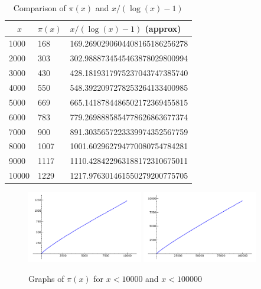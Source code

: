 \begin{table}
\caption{Comparison of $\pi(x)$ and $x/(\log(x)-1)$\label{tab:pnt}}\vspace{1ex}

\begin{center}
\begin{tabular}{|l|l|l|}\hline
$\quad{}\!x$& $\pi(x)$ & $x/(\log(x)-1)$ (approx)\\\hline
1000&   168&    169.2690290604408165186256278\\
2000&   303&    302.9888734545463878029800994\\
3000&   430&    428.1819317975237043747385740\\
4000&   550&    548.3922097278253264133400985\\
5000&   669&    665.1418784486502172369455815\\
6000&   783&    779.2698885854778626863677374\\
7000&   900&    891.3035657223339974352567759\\
8000&   1007&   1001.602962794770080754784281\\
9000&   1117&   1110.428422963188172310675011\\
10000&  1229&   1217.976301461550279200775705\\\hline
\end{tabular}
\end{center}
\end{table}

\begin{figure}
\begin{center}
\vspace{2ex}
\includegraphics[width=0.45\textwidth]{graphics/prime_pi_10000}
\vspace{4ex}
\includegraphics[width=0.45\textwidth]{graphics/prime_pi_100000}
\caption{Graphs of $\pi(x)$ for $x<10000$ and $x<100000$\label{fig:pix2}}
\end{center}
\end{figure}

